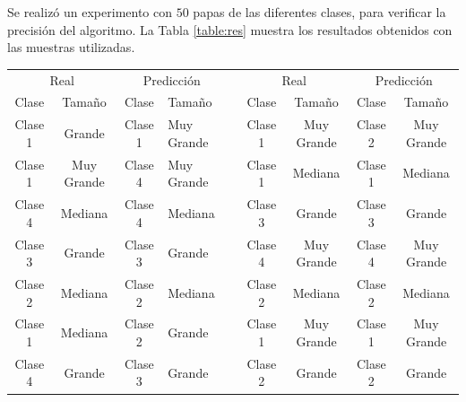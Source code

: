 Se realizó un experimento con $50$ papas de las diferentes clases, para verificar la precisión del algoritmo. La Tabla \ref{table:res} muestra los resultados obtenidos con las muestras utilizadas.

\newpage
\begin{table}[ht]
	\centering
	\resizebox{15cm}{!} {
	\begin{tabular}{|cc|cl|l|cc|cc|}
		\cline{1-4} \cline{6-9}
		\multicolumn{2}{|c|}{Real}                 & \multicolumn{2}{c|}{Predicción}           &  & \multicolumn{2}{c|}{Real}                 & \multicolumn{2}{c|}{Predicción}           \\ \cline{1-4} \cline{6-9} 
		\multicolumn{1}{|c|}{Clase}   & Tamaño     & \multicolumn{1}{c|}{Clase}   & Tamaño     &  & \multicolumn{1}{c|}{Clase}   & Tamaño     & \multicolumn{1}{c|}{Clase}   & Tamaño     \\ \cline{1-4} \cline{6-9} 
		\multicolumn{1}{|c|}{Clase 1} & Grande     & \multicolumn{1}{c|}{Clase 1} & Muy Grande &  & \multicolumn{1}{c|}{Clase 1} & Muy Grande & \multicolumn{1}{c|}{Clase 2} & Muy Grande \\ \cline{1-4} \cline{6-9} 
		\multicolumn{1}{|c|}{Clase 1} & Muy Grande & \multicolumn{1}{c|}{Clase 4} & Muy Grande &  & \multicolumn{1}{c|}{Clase 1} & Mediana    & \multicolumn{1}{c|}{Clase 1} & Mediana    \\ \cline{1-4} \cline{6-9} 
		\multicolumn{1}{|c|}{Clase 4} & Mediana    & \multicolumn{1}{c|}{Clase 4} & Mediana    &  & \multicolumn{1}{c|}{Clase 3} & Grande     & \multicolumn{1}{c|}{Clase 3} & Grande     \\ \cline{1-4} \cline{6-9} 
		\multicolumn{1}{|c|}{Clase 3} & Grande     & \multicolumn{1}{c|}{Clase 3} & Grande     &  & \multicolumn{1}{c|}{Clase 4} & Muy Grande & \multicolumn{1}{c|}{Clase 4} & Muy Grande \\ \cline{1-4} \cline{6-9} 
		\multicolumn{1}{|c|}{Clase 2} & Mediana    & \multicolumn{1}{c|}{Clase 2} & Mediana    &  & \multicolumn{1}{c|}{Clase 2} & Mediana    & \multicolumn{1}{c|}{Clase 2} & Mediana    \\ \cline{1-4} \cline{6-9} 
		\multicolumn{1}{|c|}{Clase 1} & Mediana    & \multicolumn{1}{c|}{Clase 2} & Grande     &  & \multicolumn{1}{c|}{Clase 1} & Muy Grande & \multicolumn{1}{c|}{Clase 1} & Muy Grande \\ \cline{1-4} \cline{6-9} 
		\multicolumn{1}{|c|}{Clase 4} & Grande     & \multicolumn{1}{c|}{Clase 3} & Grande     &  & \multicolumn{1}{c|}{Clase 2} & Grande     & \multicolumn{1}{c|}{Clase 2} & Grande     \\ \cline{1-4} \cline{6-9} 

\end{tabular}}
\end{table}
